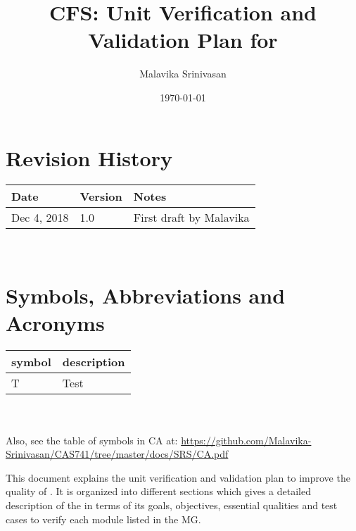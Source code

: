 \documentclass[12pt, titlepage]{article}
\begin{document}
\title{CFS: Unit Verification and Validation Plan for \famname{}} 
\author{Malavika Srinivasan}
\date{\today}
	
\maketitle


\section{Revision History}

\begin{tabularx}{\textwidth}{p{3cm}p{2cm}X}
\toprule {\bf Date} & {\bf Version} & {\bf Notes}\\
\midrule
Dec 4, 2018 & 1.0 & First draft by Malavika\\

\bottomrule
\end{tabularx}

~\newpage

\tableofcontents





\newpage

\section{Symbols, Abbreviations and Acronyms}

\renewcommand{\arraystretch}{1.2}
\begin{tabular}{l l} 
	\toprule		
	\textbf{symbol} & \textbf{description}\\
	\midrule 
	T & Test\\
	\bottomrule
\end{tabular}\\
\\



Also, see the table of symbols in CA at: 
\url{https://github.com/Malavika-Srinivasan/CAS741/tree/master/docs/SRS/CA.pdf}
\\


\newpage



This document explains the unit verification and validation plan to improve the 
quality of \famname{}. It is organized into different sections which gives a 
detailed description of the \famname{} in terms of its goals, objectives, 
essential qualities and test cases to verify each module listed in the MG. 
\end{document}
